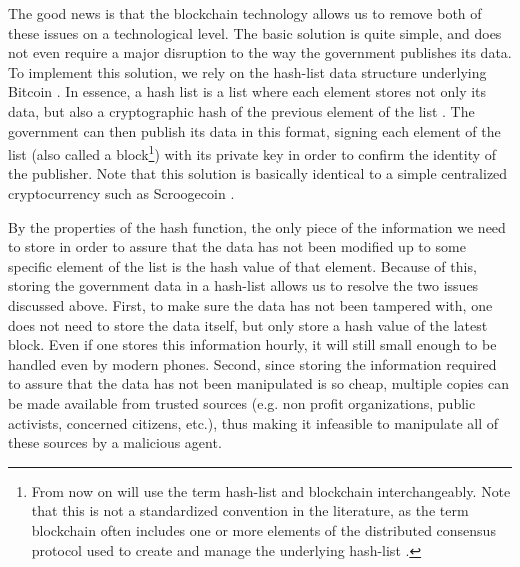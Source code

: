 The good news is that the blockchain technology allows us to remove both of these issues on a technological level. The basic solution is quite simple, and does not even require a major disruption to the way the government publishes its data. To implement this solution, we rely on the hash-list data structure underlying Bitcoin \cite{whitepaper,bitcoinbook}. In essence, a hash list is a list where each element stores not only its data, but also a cryptographic hash of the previous element of the list \cite{bitcoinbook}. The government can then publish its data in this format, signing each element of the list (also called a block\footnote{From now on will use the term hash-list and blockchain interchangeably. Note that this is not a standardized convention in the literature, as the term blockchain often includes one or more elements of the distributed consensus protocol used to create and manage the underlying hash-list \cite{NarayananC17}.}) with its private key in order to confirm the identity of the publisher. Note that this solution is basically identical to a simple centralized cryptocurrency such as Scroogecoin \cite{bitcoinbook}.

By the properties of the hash function, the only piece of the information we need to store in order to assure that the data has not been modified up to some specific element of the list is the hash value of that element. Because of this, storing the government data in a hash-list allows us to resolve the two issues discussed above. First, to make sure the data has not been tampered with, one does not need to store the data itself, but only store a hash value of the latest block. Even if one stores this information hourly, it will still small enough to be handled even by modern phones. Second, since storing the information required to assure that the data has not been manipulated is so cheap, multiple copies can be made available from trusted sources (e.g. non profit organizations, public activists, concerned citizens, etc.), thus making it infeasible to manipulate all of these sources by a malicious agent.






